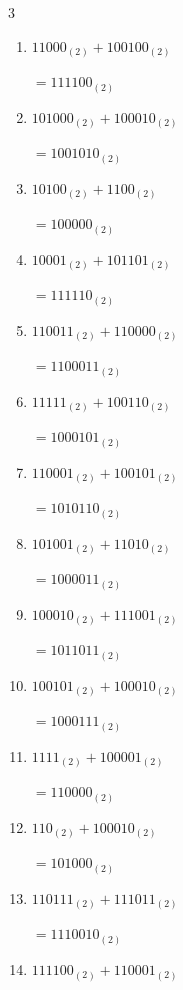 \begin{multicols}{3}
\begin{enumerate}
        $=110101_{(2)}$

  \item $11000_{(2)} + 100100_{(2)}$

        $=111100_{(2)}$

  \item $101000_{(2)} + 100010_{(2)}$

        $=1001010_{(2)}$

  \item $10100_{(2)} + 1100_{(2)}$

        $=100000_{(2)}$

  \item $10001_{(2)} + 101101_{(2)}$

        $=111110_{(2)}$

  \item $110011_{(2)} + 110000_{(2)}$

        $=1100011_{(2)}$

\columnbreak %

  \item $11111_{(2)} + 100110_{(2)}$

        $=1000101_{(2)}$

  \item $110001_{(2)} + 100101_{(2)}$

        $=1010110_{(2)}$

  \item $101001_{(2)} + 11010_{(2)}$

        $=1000011_{(2)}$

  \item $100010_{(2)} + 111001_{(2)}$

        $=1011011_{(2)}$

  \item $100101_{(2)} + 100010_{(2)}$

        $=1000111_{(2)}$

  \item $1111_{(2)} + 100001_{(2)}$

        $=110000_{(2)}$

  \item $110_{(2)} + 100010_{(2)}$

        $=101000_{(2)}$

  \item $110111_{(2)} + 111011_{(2)}$

        $=1110010_{(2)}$

  \item $111100_{(2)} + 110001_{(2)}$


\end{enumerate}
\end{multicols}
